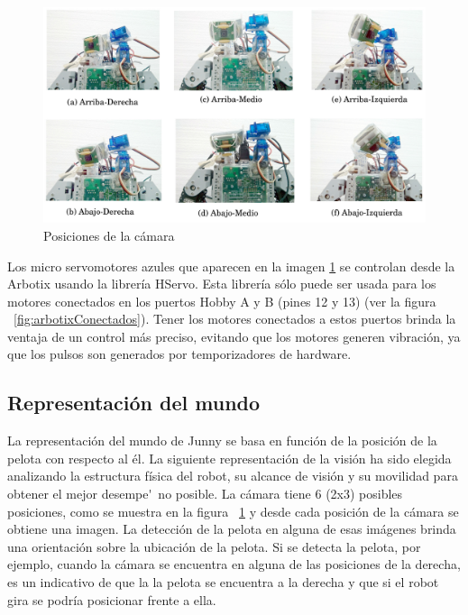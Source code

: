 \begin{figure}[hbtp]
\centering
\includegraphics[scale=0.14]{imagenes/posicionesCamara.jpg}
\caption{Posiciones de la cámara }
\label{posicionesCam}
\end{figure}

Los micro servomotores azules que aparecen en la imagen \ref{posicionesCam} se controlan desde la Arbotix usando la librería HServo. Esta librería s\'olo puede ser usada para los motores conectados en los puertos Hobby A y B (pines 12 y 13) (ver la figura ~\ref{fig:arbotixConectados}). Tener los motores conectados a estos puertos brinda la ventaja de un control más preciso, evitando que los motores generen vibración, ya que los pulsos son generados por temporizadores de hardware. 

\subsection{Representaci\'on del mundo}\label{mundo}

La representación del mundo de Junny se basa en función de la posición de la pelota con respecto al él. 
La siguiente representaci\'on de la visi\'on ha sido elegida analizando la estructura f\'isica del robot, su alcance de visi\'on y su movilidad para obtener el mejor desempe\'~no posible.
La cámara tiene 6 (2x3) posibles posiciones, como se muestra en la figura ~\ref{posicionesCam} y desde cada posición de la cámara se obtiene una imagen. La detección de la pelota en alguna de esas im\'agenes brinda una orientación sobre la ubicación de la pelota. Si se detecta la pelota, por ejemplo, cuando la cámara se encuentra en alguna de las posiciones de la derecha, es un indicativo de que la la pelota se encuentra a la derecha y que si el robot gira se podría posicionar frente a ella. 

